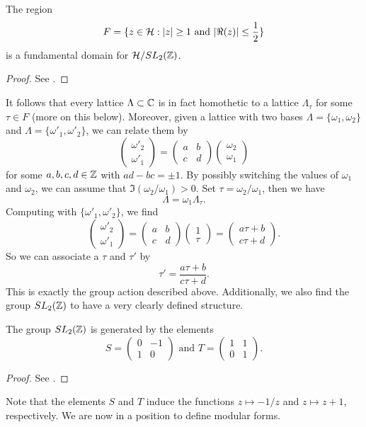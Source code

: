 \begin{prop}
The region
$$F = \{z \in \mathcal{H} : |z| \geq 1 \text{ and } |\Re(z)| \leq \frac{1}{2}\}$$
is a fundamental domain for $\mathcal{H}/SL_2(\mathbb{Z})$. 
\end{prop}
\begin{proof}
See \cite[Page 430]{Silverman}.
\end{proof}
It follows that every lattice $\Lambda \subset \mathbb{C}$ is in fact homothetic to a lattice $\Lambda_\tau$ for some $\tau \in F$ (more on this below). Moreover, given a lattice with two bases $\Lambda = \{\omega_1,\omega_2\}$ and $\Lambda = \{\omega'_1,\omega'_2\}$, we can relate them by 
$$\begin{pmatrix} \omega'_2 \\  \omega'_1  \end{pmatrix} = 
\begin{pmatrix} a & b \\  c & d \end{pmatrix} \begin{pmatrix} \omega_2 \\  \omega_1  \end{pmatrix}
$$
for some $a,b,c,d \in \mathbb{Z}$ with $ad - bc = \pm1$. By possibly switching the values of $\omega_1$ and $\omega_2$, we can assume that $\Im(\omega_2/\omega_1) > 0$. Set $\tau = \omega_2/\omega_1$, then we have
$$\Lambda  = \omega_1\Lambda_\tau.$$
Computing with $\{\omega'_1,\omega'_2\}$, we find
$$\begin{pmatrix} \omega'_2 \\  \omega'_1  \end{pmatrix} = 
\begin{pmatrix} a & b \\  c & d \end{pmatrix} \begin{pmatrix} 1 \\  \tau  \end{pmatrix} = 
\begin{pmatrix} a\tau + b \\  c\tau + d  \end{pmatrix}.
$$
So we can associate a $\tau$ and $\tau'$ by
$$\tau' = \frac{a\tau + b}{c\tau + d}.$$
This is exactly the group action described above. Additionally, we also find the group $SL_2(\mathbb{Z})$ to have a very clearly defined structure.
\begin{lem}
The group $SL_2(\mathbb{Z})$ is generated by the elements
$$S = \begin{pmatrix} 0 & -1 \\ 1 & 0 \end{pmatrix} \text{ and } T = \begin{pmatrix} 1 & 1 \\ 0 & 1 \end{pmatrix}. $$
\end{lem}\label{gens}
\begin{proof}
See \cite[Page 228]{Knapp}.
\end{proof}
Note that the elements $S$ and $T$ induce the functions $z \mapsto -1/z$ and $z \mapsto z+1$, respectively.
We are now in a position to define modular forms.

